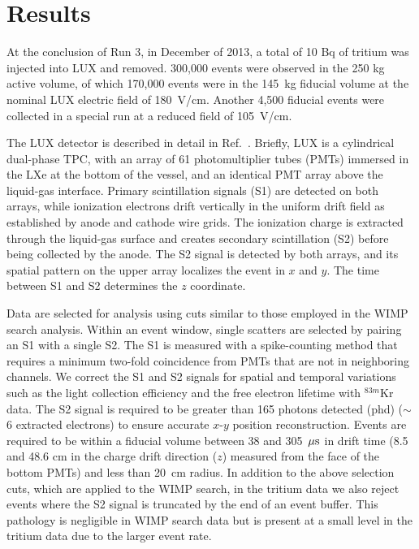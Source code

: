\section{Results}

At the conclusion of Run 3, in December of 2013, a total of 10 Bq of tritium was injected into LUX and removed. 300,000 events were observed in the 250 kg active volume, of which 170,000 events were in the 145~kg fiducial volume at the nominal LUX electric field of 180~V/cm. Another 4,500 fiducial events were collected in a special run at a reduced field of 105~V/cm. 

The LUX detector is described in detail in Ref.~\cite{lux-nim}. Briefly, LUX is a cylindrical dual-phase TPC, with an array of 61 photomultiplier tubes (PMTs) immersed in the LXe at the bottom of the vessel, and an identical PMT array above the liquid-gas interface. Primary scintillation signals (S1) are detected on both arrays, while ionization electrons drift vertically in the uniform drift field as established by anode and cathode wire grids. The ionization charge is extracted through the liquid-gas surface and creates secondary scintillation (S2) before being collected by the anode. The S2 signal is detected by both arrays, and its spatial pattern on the upper array localizes the event in $x$ and $y$. The time between S1 and S2 determines the $z$ coordinate.

Data are selected for analysis using cuts similar to those employed in the WIMP search analysis\cite{lux-reanalysis, lux-prd}. Within an event window, single scatters are selected by pairing an S1 with a single S2.  The S1 is measured with a spike-counting method that requires a minimum two-fold coincidence from PMTs that are not in neighboring channels. We correct the S1 and S2 signals for spatial and temporal variations such as the light collection efficiency and the free electron lifetime with $ ^{83m}$Kr data.  The S2 signal is required to be greater than 165 photons detected (phd) ($\sim$6 extracted electrons) to ensure accurate $x$-$y$ position reconstruction. Events are required to be within a fiducial volume between 38 and 305~$\rm \mu s$ in drift time (8.5 and 48.6 cm in the charge drift direction ($z$) measured from the face of the bottom PMTs) and less than 20~cm radius. In addition to the above selection cuts, which are applied to the WIMP search, in the tritium data we also reject events where the S2 signal is truncated by the end of an event buffer. This pathology is negligible in WIMP search data but is present at a small level in the tritium data due to the larger event rate.

